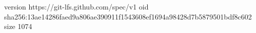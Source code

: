 version https://git-lfs.github.com/spec/v1
oid sha256:13ae14286faed9a806ae390911f1543608ef1694a98428d7b5879501bdf8c602
size 1074
